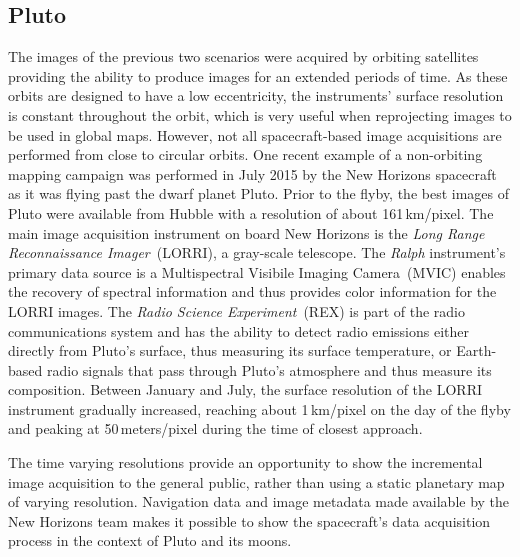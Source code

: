 \documentclass[journal]{vgtc}                %
\begin{document}
\subsection{Pluto} \label{sec:scenario:pluto}
The images of the previous two scenarios were acquired by orbiting satellites providing the ability to produce images for an extended periods of time.
As these orbits are designed to have a low eccentricity, the instruments' surface resolution is constant throughout the orbit, which is very useful when reprojecting images to be used in global maps.
However, not all spacecraft-based image acquisitions are performed from close to circular orbits.
One recent example of a non-orbiting mapping campaign was performed in July 2015 by the New Horizons spacecraft as it was flying past the dwarf planet Pluto.
Prior to the flyby, the best images of Pluto were available from Hubble with a resolution of about 161\,km/pixel.
The main image acquisition instrument on board New Horizons is the \emph{Long Range Reconnaissance Imager}~(LORRI), a gray-scale telescope.
The \emph{Ralph} instrument's primary data source is a Multispectral Visibile Imaging Camera~(MVIC) enables the recovery of spectral information and thus provides color information for the LORRI images.
The \emph{Radio Science Experiment}~(REX) is part of the radio communications system and has the ability to detect radio emissions either directly from Pluto's surface, thus measuring its surface temperature, or Earth-based radio signals that pass through Pluto's atmosphere and thus measure its composition.
Between January and July, the surface resolution of the LORRI instrument gradually increased, reaching about 1\,km/pixel on the day of the flyby and peaking at 50\,meters/pixel during the time of closest approach.

The time varying resolutions provide an opportunity to show the incremental image acquisition to the general public, rather than using a static planetary map of varying resolution. Navigation data and image metadata made available by the New Horizons team makes it possible to show the spacecraft's data acquisition process in the context of Pluto and its moons.

\end{document}
